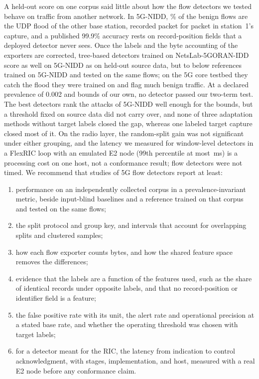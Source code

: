 A held-out score on one corpus said little about how the flow detectors we tested behave on traffic from another network. In 5G-NIDD, \RCopiesPct\% of the benign flows are the UDP flood of the other base station, recorded packet for packet in station~1's capture, and a published 99.9\% accuracy rests on record-position fields that a deployed detector never sees. Once the labels and the byte accounting of the exporters are corrected, tree-based detectors trained on NetsLab-5GORAN-IDD score as well on 5G-NIDD as on held-out source data, but \RGapTreeCleanMin{} to \RGapTreeCleanMax{} below references trained on 5G-NIDD and tested on the same flows; on the 5G core testbed they catch the flood they were trained on and flag much benign traffic. At a declared prevalence of 0.002 and bounds of our own, no detector passed our two-term test. The best detectors rank the attacks of 5G-NIDD well enough for the bounds, but a threshold fixed on source data did not carry over, and none of three adaptation methods without target labels closed the gap, whereas one labeled target capture closed most of it. On the radio layer, the random-split gain was not significant under either grouping, and the latency we measured for window-level detectors in a FlexRIC loop with an emulated E2 node (99th percentile at most \RicLoopTenPnnMax{}\,ms) is a processing cost on one host, not a conformance result; flow detectors were not timed. We recommend that studies of 5G flow detectors report at least:
\begin{enumerate}
\item performance on an independently collected corpus in a prevalence-invariant metric, beside input-blind baselines and a reference trained on that corpus and tested on the same flows;
\item the split protocol and group key, and intervals that account for overlapping splits and clustered samples;
\item how each flow exporter counts bytes, and how the shared feature space removes the differences;
\item evidence that the labels are a function of the features used, such as the share of identical records under opposite labels, and that no record-position or identifier field is a feature;
\item the false positive rate with its unit, the alert rate and operational precision at a stated base rate, and whether the operating threshold was chosen with target labels;
\item for a detector meant for the RIC, the latency from indication to control acknowledgment, with stages, implementation, and host, measured with a real E2 node before any conformance claim.
\end{enumerate}
